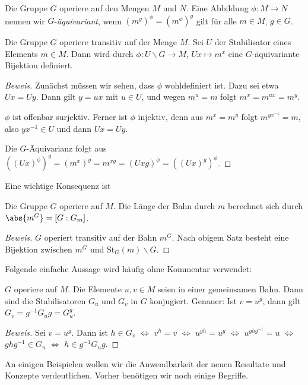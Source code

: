 \documentclass[12pt,a4paper,twoside]{article}
\newcommand{\ei}[1]{\emph{#1}\index{#1}}
\begin{document}
\begin{Definition}
  Die Gruppe $G$ operiere auf den Mengen $M$ und $N$. Eine Abbildung
  $\phi:M\to N$ nennen wir $G$-\ei{\"aquivariant}, wenn
  $(m^g)^\phi=(m^\phi)^g$ gilt f\"ur alle $m\in M$, $g\in G$.
\end{Definition}
\begin{Satz}
  Die Gruppe $G$ operiere transitiv auf der Menge $M$. Sei $U$ der
  Stabilisator eines Elements $m\in M$. Dann wird durch $\phi:U\backslash G\to
  M$, $Ux\mapsto m^x$ eine $G$-\"aquivariante Bijektion definiert.
\end{Satz}
\begin{proof}[Beweis]
  Zun\"achst m\"ussen wir sehen, dass $\phi$ wohldefiniert ist. Dazu sei etwa
  $Ux=Uy$. Dann gilt $y=ux$ mit $u\in U$, und wegen $m^u=m$ folgt
  $m^x=m^{ux}=m^y$.
  
  $\phi$ ist offenbar surjektiv. Ferner ist $\phi$ injektiv, denn aus
  $m^x=m^y$ folgt $m^{yx^{-1}}=m$, also $yx^{-1}\in U$ und dann $Ux=Uy$.
  
  Die $G$-\"Aquivarianz folgt aus
  $((Ux)^\phi)^g=(m^x)^g=m^{xg}=(Uxg)^\phi=((Ux)^g)^\phi$.
\end{proof}
Eine wichtige Konsequenz ist
\begin{Korollar}\label{K:Bahnlaenge}
  Die Gruppe $G$ operiere auf $M$. Die L\"ange der Bahn durch $m$ berechnet
  sich durch $\abs{m^G}=[G:G_m]$.
\end{Korollar}
\begin{proof}[Beweis]
  $G$ operiert transitiv auf der Bahn $m^G$. Nach obigem Satz besteht eine
  Bijektion zwischen $m^G$ und $\text{St}_G(m)\backslash G$.
\end{proof}
Folgende einfache Aussage wird h\"aufig ohne Kommentar verwendet:
\begin{Lemma}
  $G$ operiere auf $M$. Die Elemente $u,v\in M$ seien in einer gemeinsamen
  Bahn. Dann sind die Stabilisatoren $G_u$ und $G_v$ in $G$ konjugiert.
  Genauer: Ist $v=u^g$, dann gilt $G_v=g^{-1}G_ug=G_u^g$.
\end{Lemma}
\begin{proof}[Beweis]
  Sei $v=u^g$. Dann ist $h\in G_v$ $\Longleftrightarrow$ $v^h=v$
  $\Longleftrightarrow$ $u^{gh}=u^g$ $\Longleftrightarrow$ $u^{ghg^{-1}}=u$
  $\Longleftrightarrow$ $ghg^{-1}\in G_u$ $\Longleftrightarrow$ $h\in
  g^{-1}G_ug$.
\end{proof}
An einigen Beispielen wollen wir die Anwendbarkeit der neuen Resultate und
Konzepte verdeutlichen. Vorher ben\"otigen wir noch einige Begriffe.
\end{document}
